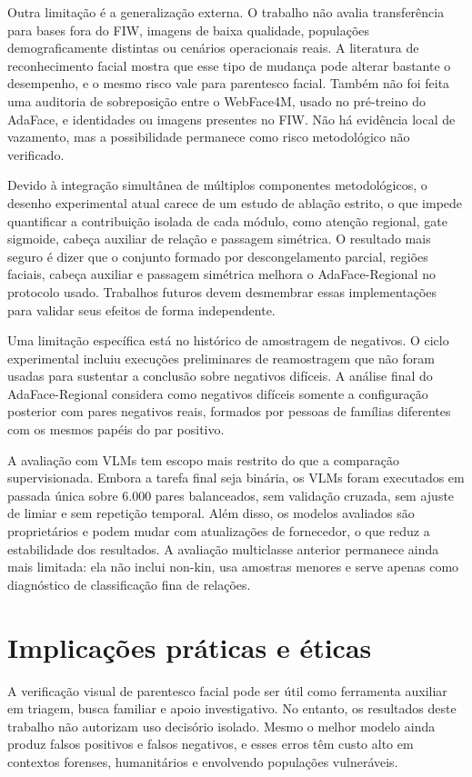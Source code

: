 Outra limitação é a generalização externa. O trabalho não avalia transferência para bases fora do FIW, imagens de baixa qualidade, populações demograficamente distintas ou cenários operacionais reais. A literatura de reconhecimento facial mostra que esse tipo de mudança pode alterar bastante o desempenho, e o mesmo risco vale para parentesco facial. Também não foi feita uma auditoria de sobreposição entre o WebFace4M, usado no pré-treino do AdaFace, e identidades ou imagens presentes no FIW. Não há evidência local de vazamento, mas a possibilidade permanece como risco metodológico não verificado.

Devido à integração simultânea de múltiplos componentes metodológicos, o desenho experimental atual carece de um estudo de ablação estrito, o que impede quantificar a contribuição isolada de cada módulo, como atenção regional, gate sigmoide, cabeça auxiliar de relação e passagem simétrica. O resultado mais seguro é dizer que o conjunto formado por descongelamento parcial, regiões faciais, cabeça auxiliar e passagem simétrica melhora o AdaFace-Regional no protocolo usado. Trabalhos futuros devem desmembrar essas implementações para validar seus efeitos de forma independente.

Uma limitação específica está no histórico de amostragem de negativos. O ciclo experimental incluiu execuções preliminares de reamostragem que não foram usadas para sustentar a conclusão sobre negativos difíceis. A análise final do AdaFace-Regional considera como negativos difíceis somente a configuração posterior com pares negativos reais, formados por pessoas de famílias diferentes com os mesmos papéis do par positivo.

A avaliação com VLMs tem escopo mais restrito do que a comparação supervisionada. Embora a tarefa final seja binária, os VLMs foram executados em passada única sobre 6.000 pares balanceados, sem validação cruzada, sem ajuste de limiar e sem repetição temporal. Além disso, os modelos avaliados são proprietários e podem mudar com atualizações de fornecedor, o que reduz a estabilidade dos resultados. A avaliação multiclasse anterior permanece ainda mais limitada: ela não inclui non-kin, usa amostras menores e serve apenas como diagnóstico de classificação fina de relações.

\section{Implicações práticas e éticas}

A verificação visual de parentesco facial pode ser útil como ferramenta auxiliar em triagem, busca familiar e apoio investigativo. No entanto, os resultados deste trabalho não autorizam uso decisório isolado. Mesmo o melhor modelo ainda produz falsos positivos e falsos negativos, e esses erros têm custo alto em contextos forenses, humanitários e envolvendo populações vulneráveis.

